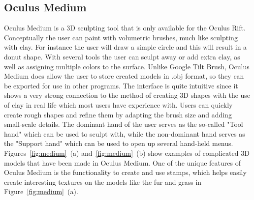 \subsection{Oculus Medium}
Oculus Medium is a 3D sculpting tool that is only available for the Oculus Rift. Conceptually the user can paint with volumetric brushes, much like sculpting with clay. For instance the user will draw a simple circle and this will result in a donut shape. With several tools the user can sculpt away or add extra clay, as well as assigning multiple colors to the surface.
Unlike Google Tilt Brush, Oculus Medium does allow the user to store created models in .obj format, so they can be exported for use in other programs. The interface is quite intuitive since it shows a very strong connection to the method of creating 3D shapes with the use of clay in real life which most users have experience with. Users can quickly create rough shapes and refine them by adapting the brush size and adding small-scale details. The dominant hand of the user serves as the so-called "Tool hand" which can be used to sculpt with, while the non-dominant hand serves as the "Support hand" which can be used to open up several hand-held menus. Figures~\ref{fig:medium}~(a) and~\ref{fig:medium}~(b) show examples of complicated 3D models that have been made in Oculus Medium. One of the unique features of Oculus Medium is the functionality to create and use stamps, which helps easily create interesting textures on the models like the fur and grass in Figure~\ref{fig:medium}~(a).


